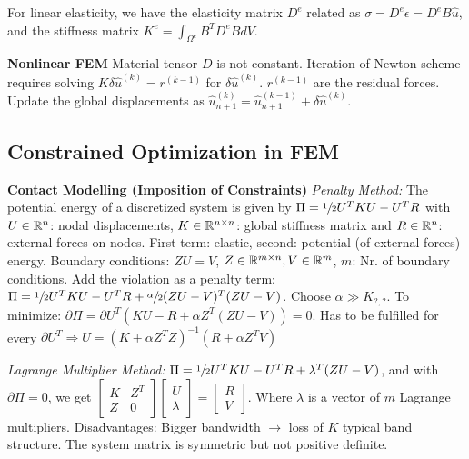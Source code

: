 For linear elasticity, we have the elasticity matrix $D^e$ related as $\sigma= D^e \epsilon = D^e B \hat{u}$, and the stiffness matrix $K ^e = \int_{\Omega^e} B^T D^e B dV$.

\textbf{Nonlinear FEM}
Material tensor $D$ is not constant. Iteration of Newton scheme requires solving $K \delta \hat{u}^{(k)} = r^{(k-1)}$ for $\delta \hat{u}^{(k)}$.
$r^{(k-1)}$ are the residual forces.
Update the global displacements as $\hat{u}_{n+1}^{(k)} = \hat{u}_{n+1}^{(k-1)} + \delta \hat{u}^{(k)}$.

\subsection*{Constrained Optimization in FEM}
\textbf{Contact Modelling (Imposition of Constraints)}
\textit{Penalty Method:}
The potential energy of a discretized system is given by $\Pi = \sfrac{1}{2} U^T K U - U^T R$ with $U\in\mathbb{R}^n$: nodal displacements, $K\in\mathbb{R}^{n\times n}$: global stiffness matrix and $R\in\mathbb{R}^n$: external forces on nodes.
First term: elastic, second: potential (of external forces) energy.
Boundary conditions: $ZU=V$, $Z\in\mathbb{R}^{m \times n}, V\in \mathbb{R}^m$, $m$: Nr. of boundary conditions. 
Add the violation as a penalty term:
$\Pi = \sfrac{1}{2} U^T K U - U^T R + \sfrac{\alpha}{2}(ZU-V)^T(ZU-V)$.
Choose $\alpha \gg K_{?,?}$.
To minimize: $\partial\Pi = \partial U^T (KU -R+\alpha Z^T (ZU-V))=0$.
Has to be fulfilled for every $\partial U^T \Rightarrow U = (K+\alpha Z^T Z)^{-1} (R+\alpha Z^T V)$

\textit{Lagrange Multiplier Method:}
$\Pi = \sfrac{1}{2} U^T K U - U^T R + \lambda^T (ZU-V)$, and with $\partial \Pi = 0$, we get $\begin{bmatrix}
K & Z^T \\
Z & 0
\end{bmatrix} \begin{bmatrix}
U \\
\lambda
\end{bmatrix} = \begin{bmatrix}
R \\
V
\end{bmatrix}$.
Where $\lambda$ is a vector of $m$ Lagrange multipliers.
Disadvantages: Bigger bandwidth $\rightarrow$ loss of $K$ typical band structure. The system matrix is symmetric but not positive definite.